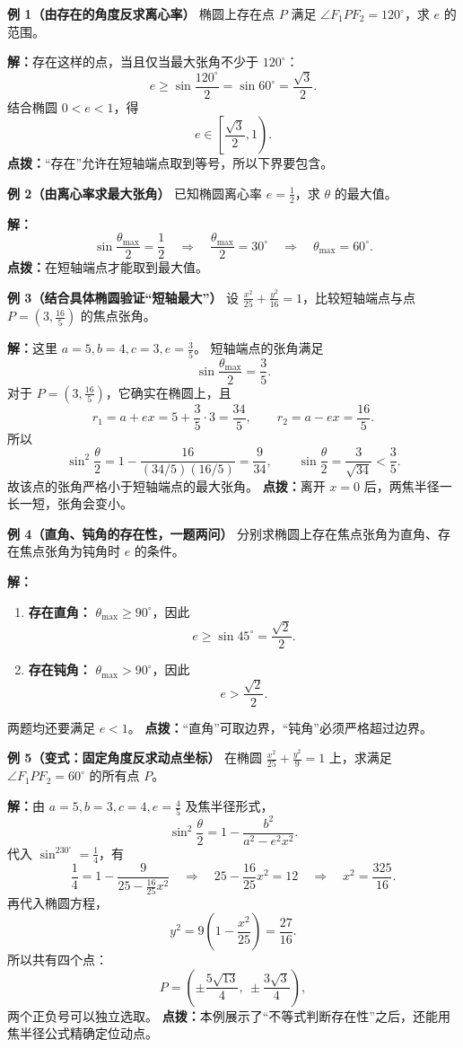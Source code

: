 \begin{examplebox}
\textbf{例 1（由存在的角度反求离心率）}\quad
椭圆上存在点 $P$ 满足 $\angle F_1PF_2=120^\circ$，求 $e$ 的范围。

\textbf{解：}存在这样的点，当且仅当最大张角不少于 $120^\circ$：
\[
e\ge\sin\frac{120^\circ}{2}
=\sin60^\circ=\frac{\sqrt3}{2}.
\]
结合椭圆 $0<e<1$，得
\[
\boxed{e\in\left[\frac{\sqrt3}{2},1\right).}
\]
\textbf{点拨：}“存在”允许在短轴端点取到等号，所以下界要包含。

\medskip
\textbf{例 2（由离心率求最大张角）}\quad
已知椭圆离心率 $e=\frac12$，求 $\theta$ 的最大值。

\textbf{解：}
\[
\sin\frac{\theta_{\max}}2=\frac12
\quad\Longrightarrow\quad
\frac{\theta_{\max}}2=30^\circ
\quad\Longrightarrow\quad
\boxed{\theta_{\max}=60^\circ.}
\]
\textbf{点拨：}在短轴端点才能取到最大值。

\medskip
\textbf{例 3（结合具体椭圆验证“短轴最大”）}\quad
设 $\frac{x^2}{25}+\frac{y^2}{16}=1$，比较短轴端点与点
$P=(3,\frac{16}{5})$ 的焦点张角。

\textbf{解：}这里 $a=5,b=4,c=3,e=\frac35$。
短轴端点的张角满足
\[
\sin\frac{\theta_{\max}}2=\frac35.
\]
对于 $P=(3,\frac{16}{5})$，它确实在椭圆上，且
\[
r_1=a+ex=5+\frac35\cdot3=\frac{34}{5},
\qquad
r_2=a-ex=\frac{16}{5}.
\]
所以
\[
\sin^2\frac\theta2
=1-\frac{16}{(34/5)(16/5)}
=\frac9{34},
\qquad
\sin\frac\theta2=\frac3{\sqrt{34}}<\frac35.
\]
故该点的张角严格小于短轴端点的最大张角。
\textbf{点拨：}离开 $x=0$ 后，两焦半径一长一短，张角会变小。

\medskip
\textbf{例 4（直角、钝角的存在性，一题两问）}\quad
分别求椭圆上存在焦点张角为直角、存在焦点张角为钝角时 $e$ 的条件。

\textbf{解：}
\begin{enumerate}
    \item \textbf{存在直角：}
    $\theta_{\max}\ge90^\circ$，因此
    \[
    \boxed{e\ge\sin45^\circ=\frac{\sqrt2}{2}.}
    \]
    \item \textbf{存在钝角：}
    $\theta_{\max}>90^\circ$，因此
    \[
    \boxed{e>\frac{\sqrt2}{2}.}
    \]
\end{enumerate}
两题均还要满足 $e<1$。
\textbf{点拨：}“直角”可取边界，“钝角”必须严格超过边界。

\medskip
\textbf{例 5（变式：固定角度反求动点坐标）}\quad
在椭圆 $\frac{x^2}{25}+\frac{y^2}{9}=1$ 上，求满足
$\angle F_1PF_2=60^\circ$ 的所有点 $P$。

\textbf{解：}由 $a=5,b=3,c=4,e=\frac45$ 及焦半径形式，
\[
\sin^2\frac\theta2
=1-\frac{b^2}{a^2-e^2x^2}.
\]
代入 $\sin^230^\circ=\frac14$，有
\[
\frac14=1-\frac{9}{25-\frac{16}{25}x^2}
\quad\Longrightarrow\quad
25-\frac{16}{25}x^2=12
\quad\Longrightarrow\quad
x^2=\frac{325}{16}.
\]
再代入椭圆方程，
\[
y^2=9\left(1-\frac{x^2}{25}\right)=\frac{27}{16}.
\]
所以共有四个点：
\[
\boxed{P=\left(\pm\frac{5\sqrt{13}}4,\ \pm\frac{3\sqrt3}4\right),}
\]
两个正负号可以独立选取。
\textbf{点拨：}本例展示了“不等式判断存在性”之后，还能用焦半径公式精确定位动点。
\end{examplebox}
